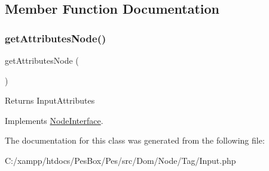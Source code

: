 \subsection{Member Function Documentation}
\mbox{\label{class_pes_1_1_dom_1_1_node_1_1_tag_1_1_input_a4722e7722b245351681b05d35f6694f3}} 
\subsubsection{\texorpdfstring{get\+Attributes\+Node()}{getAttributesNode()}}
{\footnotesize\ttfamily get\+Attributes\+Node (\begin{DoxyParamCaption}{ }\end{DoxyParamCaption})}

\begin{DoxyReturn}{Returns}
Input\+Attributes 
\end{DoxyReturn}


Implements \mbox{\hyperlink{interface_pes_1_1_dom_1_1_node_1_1_node_interface_a4722e7722b245351681b05d35f6694f3}{Node\+Interface}}.



The documentation for this class was generated from the following file\+:\begin{DoxyCompactItemize}
\item 
C\+:/xampp/htdocs/\+Pes\+Box/\+Pes/src/\+Dom/\+Node/\+Tag/Input.\+php\end{DoxyCompactItemize}
